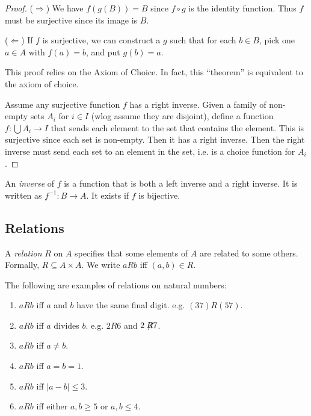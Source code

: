 \documentclass[a4paper]{article}
\begin{document}
  \begin{proof}
    ($\Rightarrow$) We have $f(g(B)) = B$ since $f\circ g$ is the identity function. Thus $f$ must be surjective since its image is $B$.

    ($\Leftarrow$) If $f$ is surjective, we can construct a $g$ such that for each $b\in B$, pick one $a\in A$ with $f(a) = b$, and put $g(b) = a$.

    \note This proof relies on the Axiom of Choice. In fact, this ``theorem'' is equivalent to the axiom of choice.

    Assume any surjective function $f$ has a right inverse. Given a family of non-empty sets $A_i$ for $i\in I$ (wlog assume they are disjoint), define a function $f: \bigcup A_i \to I$ that sends each element to the set that contains the element. This is surjective since each set is non-empty. Then it has a right inverse. Then the right inverse must send each set to an element in the set, i.e. is a choice function for $A_i$.
  \end{proof}

  \begin{defi}
    An \emph{inverse} of $f$ is a function that is both a left inverse and a right inverse. It is written as $f^{-1}: B\to A$. It exists if $f$ is bijective.
  \end{defi}

  \subsection{Relations}
  \begin{defi}[Relation]
    A \emph{relation} $R$ on $A$ specifies that some elements of $A$ are related to some others. Formally, $R\subseteq A\times A$. We write $aRb$ iff $(a, b)\in R$.
  \end{defi}

  \begin{eg}
    The following are examples of relations on natural numbers:
    \begin{enumerate}
      \item $aRb$ iff $a$ and $b$ have the same final digit. e.g. $(37)R(57)$.
      \item $aRb$ iff $a$ divides $b$. e.g. $2R6$ and $2\not \!\!R 7$.
      \item $aRb$ iff $a\not= b$.
      \item $aRb$ iff $a = b = 1$.
      \item $aRb$ iff $|a - b|\leq 3$.
      \item $aRb$ iff either $a, b\geq 5$ or $a, b\leq 4$.
    \end{enumerate}
  \end{eg}
\end{document}
